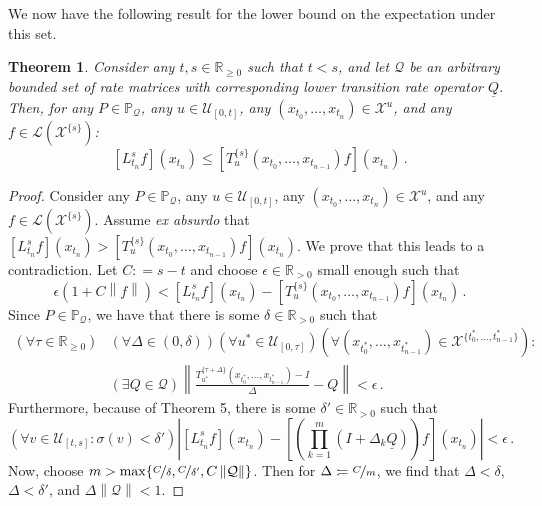 \documentclass[a4paper,reqno]{amsart}
\newtheorem{theorem}{Theorem}
\newcommand{\reals}{\mathbb{R}}
\newcommand{\realspos}{\reals_{>0}}
\newcommand{\realsnonneg}{\reals_{\geq 0}}
\newcommand{\states}{\mathcal{X}}
\newcommand{\gambles}{\mathcal{L}}
\newcommand{\lrate}{\underline{Q}}
\newcommand{\norm}[1]{\left\lVert #1 \right\rVert}
\newcommand{\coloneqq}{:\!=}
\begin{document}
\noindent We now have the following result for the lower bound on the expectation under this set.

\begin{theorem}\label{theorem:nonmarkov_single_var_lower_bounded}
Consider any $t,s\in\realsnonneg$ such that $t<s$, and let $\mathcal{Q}$ be an arbitrary bounded set of rate matrices with corresponding lower transition rate operator $\lrate$. Then, for any $P\in\mathbb{P}_{\mathcal{Q}}$, any $u\in\mathcal{U}_{[0,t]}$, any $(x_{t_0},\ldots,x_{t_n})\in\states^u$, and any $f\in\gambles(\states^{\{s\}})$:
\begin{equation*}
\left[L_{t_n}^s f\right](x_{t_n}) \leq \left[T_u^{\{s\}}(x_{t_0},\ldots,x_{t_{n-1}})f\right](x_{t_n})\,.
\end{equation*}
\end{theorem}
\begin{proof}
Consider any $P\in\mathbb{P}_{\mathcal{Q}}$, any $u\in\mathcal{U}_{[0,t]}$, any $(x_{t_0},\ldots,x_{t_n})\in\states^u$, and any $f\in\gambles(\states^{\{s\}})$. Assume \emph{ex absurdo} that $\left[L_{t_n}^sf\right](x_{t_n}) > \left[T_u^{\{s\}}(x_{t_0},\ldots,x_{t_{n-1}})f\right](x_{t_n})$. We prove that this leads to a contradiction. Let $C\coloneqq s-t$ and choose $\epsilon\in\realspos$ small enough such that
\begin{equation}
\epsilon(1 + C\norm{f}) < \left[L_{t_n}^sf\right](x_{t_n}) - \left[T_u^{\{s\}}(x_{t_0},\ldots,x_{t_{n-1}})f\right](x_{t_n})\,.
\end{equation}
Since $P\in\mathbb{P}_\mathcal{Q}$, we have that there is some $\delta\in\realspos$ such that
\begin{align}
(\forall \tau\in\realsnonneg)&(\forall\Delta\in(0,\delta))(\forall u^*\in\mathcal{U}_{[0,\tau]})(\forall (x_{t_0^*},\ldots,x_{t_{n-1}^*})\in\states^{\{t_0^*,\ldots,t_{n-1}^*\}}): \\
&(\exists Q\in\mathcal{Q}) \norm{\frac{T_{u^*}^{\{\tau+\Delta\}}(x_{t_0^*},\ldots,x_{t_{n-1}^*}) - I}{\Delta} - Q} < \epsilon\,.
\end{align}
Furthermore, because of Theorem 5, there is some $\delta'\in\realspos$ such that
\begin{equation}
(\forall v\in\mathcal{U}_{[t,s]} : \sigma(v) < \delta') \left\vert \left[L_{t_n}^s f\right](x_{t_n}) - \left[\left(\prod_{k=1}^m(I + \Delta_k\lrate)\right)f\right](x_{t_n})\right\vert < \epsilon\,.
\end{equation}
Now, choose $m > \max\{\nicefrac{C}{\delta}, \nicefrac{C}{\delta'},C\norm{\mathcal{Q}} \}$. Then for $\Delta\coloneqq\nicefrac{C}{m}$, we find that $\Delta<\delta$, $\Delta<\delta'$, and $\Delta\norm{\mathcal{Q}}<1$.


\end{proof}
\end{document}
